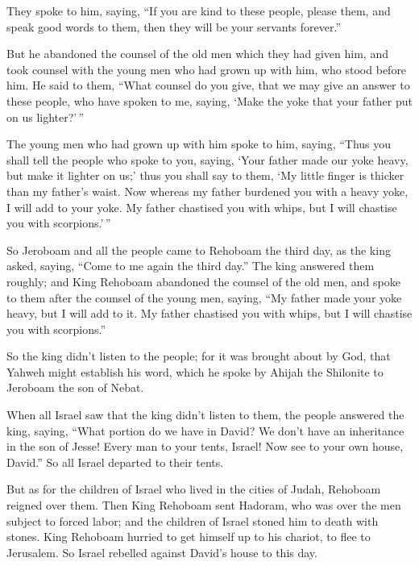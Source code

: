  They spoke to him, saying, ``If you are kind to these
people, please them, and speak good words to them, then they will be
your servants forever.''

 But he abandoned the counsel of the old men which they
had given him, and took counsel with the young men who had grown up with
him, who stood before him.  He said to them, ``What
counsel do you give, that we may give an answer to these people, who
have spoken to me, saying, `Make the yoke that your father put on us
lighter?'\,''

 The young men who had grown up with him spoke to him,
saying, ``Thus you shall tell the people who spoke to you, saying, `Your
father made our yoke heavy, but make it lighter on us;' thus you shall
say to them, `My little finger is thicker than my father's waist.
 Now whereas my father burdened you with a heavy yoke, I
will add to your yoke. My father chastised you with whips, but I will
chastise you with scorpions.'\,''

 So Jeroboam and all the people came to Rehoboam the
third day, as the king asked, saying, ``Come to me again the third
day.''  The king answered them roughly; and King Rehoboam
abandoned the counsel of the old men,  and spoke to them
after the counsel of the young men, saying, ``My father made your yoke
heavy, but I will add to it. My father chastised you with whips, but I
will chastise you with scorpions.''

 So the king didn't listen to the people; for it was
brought about by God, that Yahweh might establish his word, which he
spoke by Ahijah the Shilonite to Jeroboam the son of Nebat.

 When all Israel saw that the king didn't listen to them,
the people answered the king, saying, ``What portion do we have in
David? We don't have an inheritance in the son of Jesse! Every man to
your tents, Israel! Now see to your own house, David.'' So all Israel
departed to their tents.

 But as for the children of Israel who lived in the
cities of Judah, Rehoboam reigned over them.  Then King
Rehoboam sent Hadoram, who was over the men subject to forced labor; and
the children of Israel stoned him to death with stones. King Rehoboam
hurried to get himself up to his chariot, to flee to Jerusalem.
 So Israel rebelled against David's house to this day.

